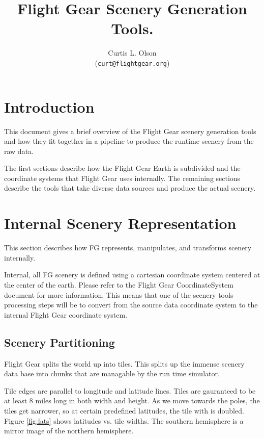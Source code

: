 \documentclass[12pt]{article}
\begin{document}
\title{
  Flight Gear Scenery Generation Tools.
}


\author{
    Curtis L. Olson\\ 
    (\texttt{curt@flightgear.org})
}


\maketitle


\section{Introduction}

This document gives a brief overview of the Flight Gear scenery
generation tools and how they fit together in a pipeline to produce
the runtime scenery from the raw data.

The first sections describe how the Flight Gear Earth is subdivided
and the coordinate systems that Flight Gear uses internally.  The
remaining sections describe the tools that take diverse data sources
and produce the actual scenery.


\section{Internal Scenery Representation}

This section describes how FG represents, manipulates, and
transforms scenery internally.

Internal, all FG scenery is defined using a cartesian coordinate
system centered at the center of the earth.  Please refer to the
Flight Gear CoordinateSystem document for more information.  This
means that one of the scenery tools processing steps will be to
convert from the source data coordinate system to the internal Flight
Gear coordinate system.


\subsection{Scenery Partitioning}

Flight Gear splits the world up into tiles.  This splits up the
immense scenery data base into chunks that are managable by the run
time simulator.

Tile edges are parallel to longitude and latitude lines.  Tiles are
gauranteed to be at least 8 miles long in both width and height.  As
we move towards the poles, the tiles get narrower, so at certain
predefined latitudes, the tile with is doubled.  Figure \ref{fig:lats}
shows latitudes vs.  tile widths.  The southern hemisphere is a mirror
image of the northern hemisphere.
\end{document}

